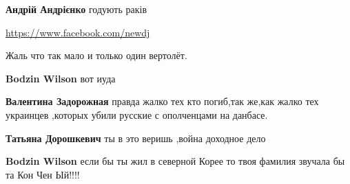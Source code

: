 \begin{itemize}
\begin{itemize}
\textbf{Андрій Андрієнко} годують раків
\end{itemize}

\url{https://www.facebook.com/newdj}\par
 
Жаль что так мало и только один вертолёт.

\begin{itemize}
 
\textbf{Bodzin Wilson} вот иуда

\begin{itemize}
 
\textbf{Валентина Задорожная} правда жалко тех кто погиб,так же,как жалко тех украинцев ,которых убили русские с ополченцами на данбасе.

 
\textbf{Татьяна Дорошкевич} ты в это веришь ,война доходное дело
\end{itemize}

 
\textbf{Bodzin Wilson} если бы ты жил в северной Корее то твоя фамилия звучала бы та Кон Чен Ый!!!!

\end{itemize}



\end{itemize}
